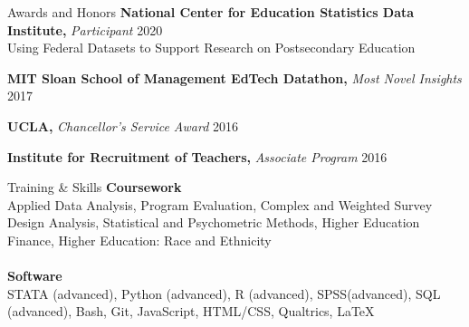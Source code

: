 \documentclass{resume} %
\begin{document}
\begin{rSection}{Awards and Honors} 
    {{\bf National Center for Education Statistics Data Institute,} \em Participant}
    \hfill {2020}
    \\
    Using Federal Datasets to Support Research on Postsecondary Education 

    {{\bf MIT Sloan School of Management EdTech Datathon,} \em Most Novel Insights }
    \hfill {2017}

    {{\bf UCLA,} \em Chancellor’s Service Award }
    \hfill {2016}

    {{\bf Institute for Recruitment of Teachers,} \em Associate Program }
    \hfill {2016}

    \end{rSection}
\begin{rSection}{Training \& Skills}
        {\bf Coursework}
        \\ Applied Data Analysis, Program Evaluation, Complex and Weighted Survey Design Analysis, 
        Statistical and Psychometric Methods, Higher Education Finance, Higher Education: Race and Ethnicity
        \\ \\ {\bf Software}
        \\ STATA (advanced), Python (advanced), R (advanced), SPSS(advanced), SQL (advanced), Bash, Git, JavaScript, HTML/CSS, Qualtrics, \LaTeX
\end{rSection}
\end{document}
